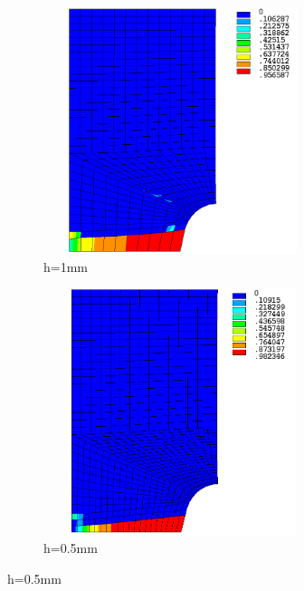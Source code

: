 \documentclass[12pt,a4paper,twoside,openright]{report}
\begin{document}
\\\\
\begin{figure}[htbp!]
 \centering
     \captionsetup[subfigure]{justification=centering}
     \begin{subfigure}{0.4\textwidth}
      \centering
         \includegraphics[width=8cm,height=7.2cm,keepaspectratio]{25.d2-1.png}
         \caption{h=1mm}
         \label{fig:d2-1}
     \end{subfigure}
     \hspace{1.8cm}
     \begin{subfigure}{0.4\textwidth}
      \centering
         \includegraphics[width=8cm,height=7.2cm,keepaspectratio]{25.d2-0.5.png}
         \caption{h=0.5mm}
         \label{fig:d2-0.5}
     \end{subfigure}
\end{figure}
\end{document}
